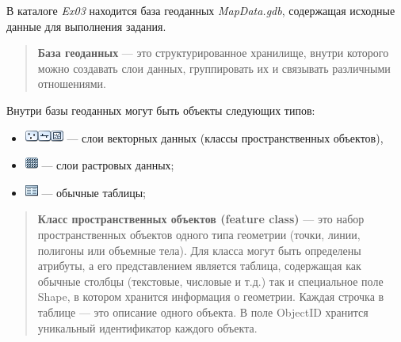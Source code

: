 \documentclass[12pt,]{book}
\providecommand{\tightlist}{%
  \setlength{\itemsep}{0pt}\setlength{\parskip}{0pt}}
\begin{document}
В каталоге \emph{Ex03} находится база геоданных \emph{MapData.gdb}, содержащая
исходные данные для выполнения задания.

\begin{quote}
\textbf{База геоданных} --- это структурированное хранилище, внутри которого
можно создавать слои данных, группировать их и связывать различными
отношениями.
\end{quote}

Внутри базы геоданных могут быть объекты следующих типов:

\begin{itemize}
\tightlist
\item
  \includegraphics{images/Ex03/image7.png}\includegraphics{images/Ex03/image8.png}\includegraphics{images/Ex03/image9.png} --- слои векторных данных (классы пространственных объектов),
\item
  \includegraphics{images/Ex03/image10.png} --- слои растровых данных;
\item
  \includegraphics{images/Ex03/image11.png} --- обычные таблицы;
\end{itemize}

\begin{quote}
\textbf{Класс пространственных объектов (feature class)} --- это набор
пространственных объектов одного типа геометрии (точки, линии, полигоны
или объемные тела). Для класса могут быть определены атрибуты, а его
представлением является таблица, содержащая как обычные столбцы
(текстовые, числовые и т.д.) так и специальное поле Shape, в котором
хранится информация о геометрии. Каждая строчка в таблице --- это описание
одного объекта. В поле ObjectID хранится уникальный идентификатор каждого объекта.
\end{quote}
\end{document}
